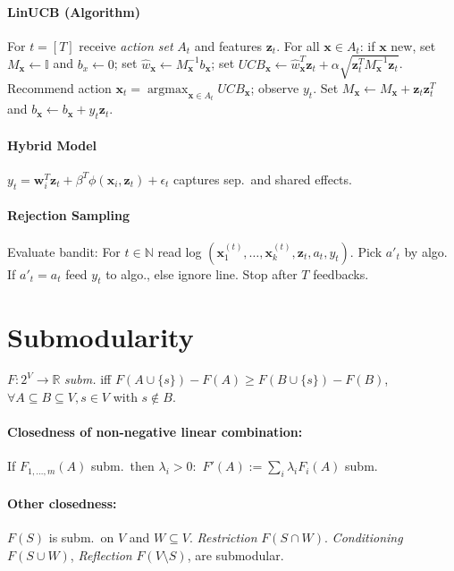 \documentclass[10pt]{scrartcl}
\DeclareMathOperator{\argmax}{argmax}
\newcommand{\eps}{\epsilon}
\newcommand{\N}{\mathbb{N}}
\newcommand{\R}{\mathbb{R}}
\begin{document}
\begin{multicols}{3}
\paragraph{LinUCB (Algorithm)}
For $t = [T]$ receive \emph{action set} $A_t$ and features $\bm z_t$. For all $\bm x \in A_t$: if $\bm x$ new, set $M_{\bm x} \leftarrow \mathbb{I}$ and $b_x \leftarrow 0$;
set $\hat w_{\bm x} \leftarrow M_{\bm x}^{-1}b_{\bm x}$;
set $UCB_{\bm x} \leftarrow \hat w_{\bm x}^T \bm z_t + \alpha\sqrt{\bm z_t^T M_{\bm x}^{-1} \bm z_t}$.
Recommend action $\bm x_t = \argmax_{\bm x \in A_t} UCB_{\bm x}$; observe $y_t$.
Set $M_{\bm x} \leftarrow M_{\bm x} + \bm z_t \bm z_t^T$ and $b_{\bm x} \leftarrow b_{\bm x} + y_t \bm z_t$.

\paragraph{Hybrid Model}
$y_t = \bm w_i^T \bm z_t + \beta^T \phi(\bm x_i,\bm z_t) + \eps_t$
captures sep.\ and shared effects.

\paragraph{Rejection Sampling}
Evaluate bandit: For $t \in \N$ read log $(\bm x_1^{(t)},\dots,\bm x_k^{(t)},\bm z_t,a_t,y_t)$.
Pick $a'_t$ by algo. If $a'_t = a_t$ feed $y_t$ to algo., else ignore line. Stop after $T$ feedbacks.

\section{Submodularity}
$F:2^V \rightarrow \R$ \emph{subm.} iff $F(A \cup \{s \})-F(A) \geq F(B\cup \{s\})-F(B)$,\\
$\forall A \subseteq B \subseteq V, s \in V$ with $s \notin B$.

\paragraph{Closedness of non-negative linear combination:}
If $F_{1,\dots,m}(A)$ subm.\ then $\lambda_i>0:$ $F'(A) := \sum_i \lambda_i F_i(A)$ subm.

\paragraph{Other closedness:} $F(S)$ is subm.\ on $V$ and $W\subseteq V$. \emph{Restriction} $F(S \cap W)$. \emph{Conditioning}  $F(S \cup W)$, \emph{Reflection} $F(V \setminus S)$, are submodular.


\end{multicols}
\end{document}
